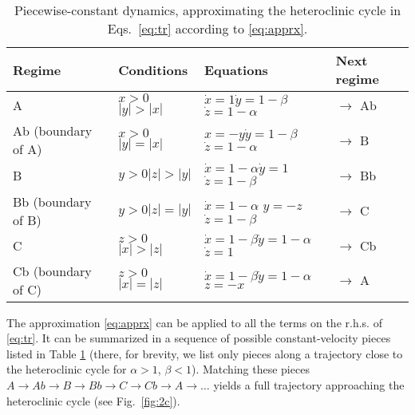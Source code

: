 \documentclass[3p,number,review,sort&compress]{elsarticle}
\begin{document}
\begin{table}[!htb]
\centering
\begin{tabular}{|p{}|p{}|p{}|p{}|}
\hline
Regime & Conditions & Equations & Next regime\\ \hline
 A &$x>0$\newline  $|y|>|x|$&
$\dot x =1$\newline $\dot y=1-\beta$\newline $\dot z=1-\alpha$& $\to$ Ab\\ \hline
 Ab (boundary of A) &$x>0$\newline $|y|=|x|$ & $x=-y$\newline $\dot y=1-\beta$
\newline $\dot z=1-\alpha$& $\to$ B\\
\hline
 B & $y>0$\newline $|z|>|y|$&
$\dot x =1-\alpha$\newline $\dot y=1$\newline $\dot z=1-\beta$ & $\to$ Bb\\ \hline
 Bb (boundary of B) &$y>0$\newline $|z|=|y|$ & $\dot x=1-\alpha$\newline 
$ y=-z$\newline $\dot z=1-\beta$& $\to$ C\\
\hline
 C & $z>0$\newline $|x|>|z|$&
$\dot x =1-\beta$\newline $\dot y=1-\alpha$\newline $\dot z=1$ & $\to$ Cb\\ \hline
Cb (boundary of C) &$z>0$\newline $|x|=|z|$ & $\dot x=1-\beta$\newline $\dot y=1-\alpha$\newline $ z=-x$& $\to$ A\\
\hline
\end{tabular}
\caption{Piecewise-constant dynamics, approximating the heteroclinic cycle
in Eqs.~\eqref{eq:tr} according to \eqref{eq:apprx}. }
\label{tab:t1}
\end{table}


The approximation \eqref{eq:apprx} can be applied to all the terms on the r.h.s. of \eqref{eq:tr}. It can be summarized in a sequence of 
possible constant-velocity pieces listed in Table \ref{tab:t1} (there, for brevity,
we list only pieces along a trajectory close to the heteroclinic cycle for $\alpha>1$, $\beta<1$). 
Matching these pieces $A\to Ab\to B\to Bb\to C\to Cb\to A\to \ldots$ yields a full trajectory approaching
 the heteroclinic cycle (see Fig.~\ref{fig:2c}).
\end{document}
